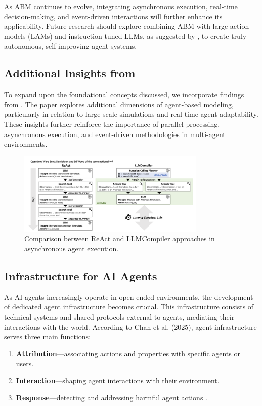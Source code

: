 As ABM continues to evolve, integrating asynchronous execution, real-time decision-making, and event-driven interactions will further enhance its applicability. Future research should explore combining ABM with large action models (LAMs) and instruction-tuned LLMs, as suggested by \cite{ginart2024}, to create truly autonomous, self-improving agent systems.

\subsection{Additional Insights from \cite{ginart2024}}

To expand upon the foundational concepts discussed, we incorporate findings from \cite{ginart2024}. The paper explores additional dimensions of agent-based modeling, particularly in relation to large-scale simulations and real-time agent adaptability. These insights further reinforce the importance of parallel processing, asynchronous execution, and event-driven methodologies in multi-agent environments.

\begin{figure}[h]
\centering
\includegraphics[width=0.8\textwidth]{Assets/agent-architecture.png}
\caption{Comparison between ReAct and LLMCompiler approaches in asynchronous agent execution.}
\end{figure}

\newpage
\subsection{Infrastructure for AI Agents}

As AI agents increasingly operate in open-ended environments, the development of dedicated agent infrastructure becomes crucial. This infrastructure consists of technical systems and shared protocols external to agents, mediating their interactions with the world. According to Chan et al. (2025), agent infrastructure serves three main functions: 
\begin{enumerate}
    \item \textbf{Attribution}—associating actions and properties with specific agents or users.
    \item \textbf{Interaction}—shaping agent interactions with their environment.
    \item \textbf{Response}—detecting and addressing harmful agent actions \cite{chan2025}.
\end{enumerate}

